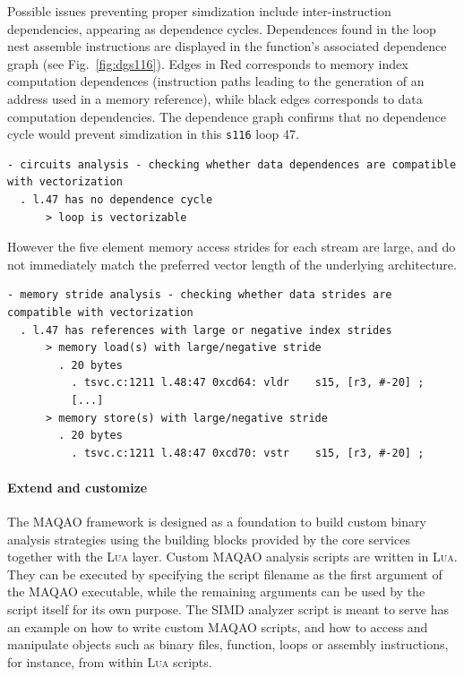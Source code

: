 \documentclass[11pt, a4paper, twoside]{montblanc2}
\def\lua{\textsc{Lua}\xspace}
\begin{document}
Possible issues preventing proper simdization include inter-instruction 
dependencies, appearing as dependence cycles. Dependences found in the loop nest 
assemble instructions are displayed in the function's associated dependence 
graph (see Fig.~\ref{fig:dgs116}). Edges in Red corresponds to memory index 
computation dependences (instruction paths leading to the generation of an 
address used in a memory reference), while black edges corresponds to data 
computation dependencies. The dependence graph confirms that no dependence cycle 
would prevent simdization in this \texttt{s116} loop 47.

\begin{small}
\begin{verbatim}
- circuits analysis - checking whether data dependences are compatible with vectorization
  . l.47 has no dependence cycle
      > loop is vectorizable
\end{verbatim}
\end{small}

However the five element memory access strides for each stream are large, and do not immediately
match the preferred vector length of the underlying architecture.

\begin{small}
\begin{verbatim}
- memory stride analysis - checking whether data strides are compatible with vectorization
  . l.47 has references with large or negative index strides
      > memory load(s) with large/negative stride
        . 20 bytes
          . tsvc.c:1211 l.48:47 0xcd64: vldr	s15, [r3, #-20] ;
          [...]
      > memory store(s) with large/negative stride
        . 20 bytes
          . tsvc.c:1211 l.48:47 0xcd70: vstr	s15, [r3, #-20] ;
\end{verbatim}
\end{small}

\paragraph{Extend and customize}

The MAQAO framework is designed as a foundation to build custom binary analysis strategies using the 
building blocks provided by the core services together with the \lua layer. Custom MAQAO analysis 
scripts are written in \lua. They can be executed by specifying the script filename as the first 
argument of the MAQAO executable, while the remaining arguments can be used by the script itself for 
its own purpose. The SIMD analyzer script is meant to serve has an example on how to write custom 
MAQAO scripts, and how to access and manipulate objects such as binary files, function, loops or 
assembly instructions, for instance, from within \lua scripts.
\end{document}

